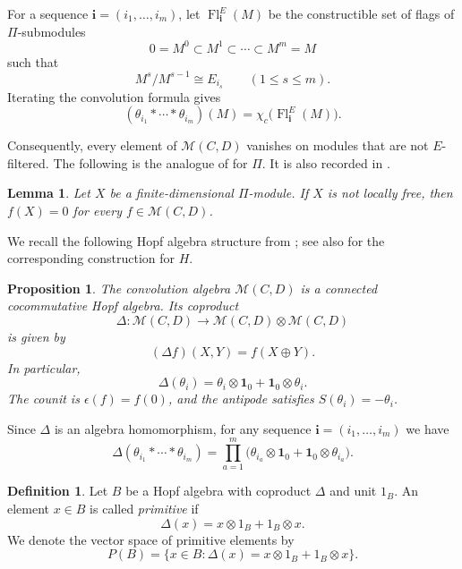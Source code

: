 \documentclass[12pt,reqno]{amsart}
\numberwithin{equation}{section}
\newtheorem{proposition}[theorem]{Proposition}
\newtheorem{lemma}[theorem]{Lemma}
\theoremstyle{definition}
\newtheorem{definition}[theorem]{Definition}
\theoremstyle{remark}
\newcommand{\Fl}{\operatorname{Fl}}
\theoremstyle{plain}
\theoremstyle{plain}
\begin{document}
   For a sequence $\mathbf i=(i_1,\ldots,i_m)$, let $\Fl_{\mathbf i}^{E}(M)$ be the constructible set of flags of $\Pi$-submodules
   \[
   0=M^0\subset M^1\subset\cdots\subset M^m=M
   \]
   such that
   \[
   M^s/M^{s-1}\cong E_{i_s} \qquad (1\le s\le m).
   \]
   Iterating the convolution formula gives
   \begin{equation}\label{eq:Pi-flag-evaluation}
   (\theta_{i_1}*\cdots*\theta_{i_m})(M)
   =
   \chi_c\bigl(\Fl_{\mathbf i}^{E}(M)\bigr).
   \end{equation}

   Consequently, every element of $\mathcal M(C,D)$ vanishes on modules that are not $E$-filtered. The following is the analogue of \cite[Lemma~4.2]{GLS16} for $\Pi$. It is also recorded in \cite[Section~2.5]{GLS18}.
   \begin{lemma}\label{lem:locally-free-support}
   Let $X$ be a finite-dimensional $\Pi$-module. If $X$ is not locally free, then $f(X)=0$ for every $f\in\mathcal M(C,D)$.
   \end{lemma}
   
   We recall the following Hopf algebra structure from \cite[Section~2.5]{GLS18}; see also \cite[Propositions~4.5 and~4.7]{GLS16} for the corresponding construction for $H$.
   
   \begin{proposition}\label{prop:Hopf-structure}
   The convolution algebra $\mathcal M(C,D)$ is a connected cocommutative Hopf algebra. Its coproduct
   \[
   \Delta:\mathcal M(C,D)\longrightarrow \mathcal M(C,D)\otimes\mathcal M(C,D)
   \]
   is given by
   \[
   (\Delta f)(X,Y)=f(X\oplus Y).
   \]
   In particular,
   \[ \Delta(\theta_i) = \theta_i\otimes\mathbf1_0 + \mathbf1_0\otimes\theta_i.
   \]
   The counit is $\epsilon(f)=f(0)$, and the antipode satisfies $S(\theta_i)=-\theta_i$.
\end{proposition}
   Since $\Delta$ is an algebra homomorphism, for any sequence $\mathbf i=(i_1,\ldots,i_m)$ we have
   \[
   \Delta(\theta_{i_1}*\cdots*\theta_{i_m})
   =
   \prod_{a=1}^{m} \bigl(
   \theta_{i_a}\otimes\mathbf1_0 + \mathbf1_0\otimes\theta_{i_a} \bigr).
   \]

   \begin{definition}\label{def:primitive-element}
   Let $B$ be a Hopf algebra with coproduct $\Delta$ and unit $1_B$. An element $x\in B$ is called \emph{primitive} if
   \[
   \Delta(x)=x\otimes 1_B+1_B\otimes x.
   \]
   We denote the vector space of primitive elements by
   \[
   P(B)= \{x\in B:\Delta(x)=x\otimes 1_B+1_B\otimes x\}.
   \]
   \end{definition}
   
\end{document}
